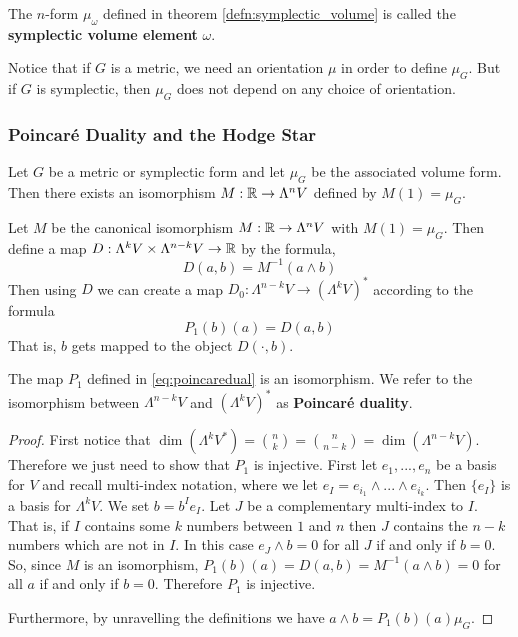 \begin{defn}
    The $n$-form $\mu_\omega$ defined in theorem \ref{defn:symplectic_volume} is called the \textbf{symplectic volume element}  $\omega$.
\end{defn}
\begin{remark*}
    Notice that if $G$ is a metric, we need an orientation $\mu$ in order to define $\mu_G$. But if $G$ is symplectic, then $\mu_G$ does not depend on any choice of orientation.
\end{remark*}

\subsubsection{Poincar\'e Duality and the Hodge Star}
\begin{remark*}
Let $G$ be a metric or symplectic form and let $\mu_G$ be the associated volume form. Then there exists an isomorphism $M : \operatorname{\mathbb{R}} \to \Lambda^n V$ defined by $M(1) = \mu_G$.
\end{remark*}
\begin{defn}
Let $M$ be the canonical isomorphism $M : \operatorname{\mathbb{R}} \to \Lambda^n V$ with $M(1)=\mu_G$. Then define a map $D : \Lambda^k V\times \Lambda^{n-k}V \to \operatorname{\mathbb{R}}$ by the formula,
\[D(a,b) = M^{-1}(a\wedge b)\]
Then using $D$ we can create a map $D_0 : \Lambda^{n-k}V\to (\Lambda^k V)^*$ according to the formula 
\begin{equation}P_1(b)(a) = D(a,b)\label{eq:poincaredual}\end{equation}
That is, $b$ gets mapped to the object $D(\cdot,b)$.
\end{defn}
\begin{thm}
    The map $P_1$ defined in \eqref{eq:poincaredual} is an isomorphism. We refer to the isomorphism between $\Lambda^{n-k}V$ and $(\Lambda^k V)^*$ as \textbf{Poincar\'e duality}.
\end{thm}
\begin{proof}
    First notice that $\dim (\Lambda^{k}V^*) = \binom{n}{k} = \binom{n}{n-k} = \dim (\Lambda^{n-k} V)$. Therefore we just need to show that $P_1$ is injective. First let $e_1,...,e_n$ be a basis for $V$ and recall multi-index notation, where we let $e_I = e_{i_1}\wedge...\wedge e_{i_k}$. Then $\{e_I\}$ is a basis for $\Lambda^k V$. We set $b = b^I e_I$. Let $J$ be a complementary multi-index to $I$. That is, if $I$ contains some $k$ numbers between $1$ and $n$ then $J$ contains the $n-k$ numbers which are not in $I$. In this case $e_J \wedge b = 0$ for all $J$ if and only if $b=0$. So, since $M$ is an isomorphism, $P_1(b)(a) = D(a,b) = M^{-1}(a\wedge b) = 0$ for all $a$ if and only if $b=0$. Therefore $P_1$ is injective.

    Furthermore, by unravelling the definitions we have $a \wedge b = P_1(b)(a)\mu_G$.
\end{proof}
